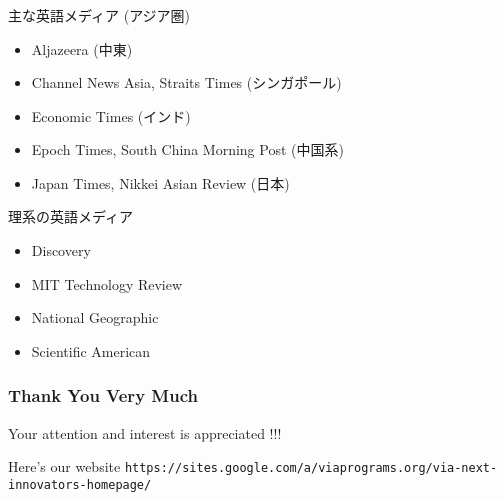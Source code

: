 \documentclass[dvipdfmx,10pt]{beamer}
\newcommand{\bb}{\begin{block}}
\newcommand{\eb}{\end{block}}
\newcommand{\ft}{\frametitle}
\begin{document}
\begin{frame}\frametitle{\insertsection}
\footnotesize
\begin{exampleblock}{主な英語メディア (アジア圏)}
\begin{itemize}
\item Aljazeera (中東)
\item Channel News Asia, Straits Times (シンガポール)
\item Economic Times (インド)
\item Epoch Times, South China Morning Post (中国系)
\item Japan Times, Nikkei Asian Review (日本)
\end{itemize}
\end{exampleblock}
\begin{exampleblock}{理系の英語メディア}
\begin{itemize}
\item Discovery
\item MIT Technology Review
\item National Geographic
\item Scientific American
\end{itemize}
\end{exampleblock}

\normalsize
\end{frame}

\begin{frame}\ft{Thank You Very Much}
Your attention and interest is appreciated !!!
\bb{Here's our website}
\footnotesize
\texttt{https://sites.google.com/a/viaprograms.org/via-next-innovators-homepage/}
\normalsize
\eb
\end{frame}
\end{document}
